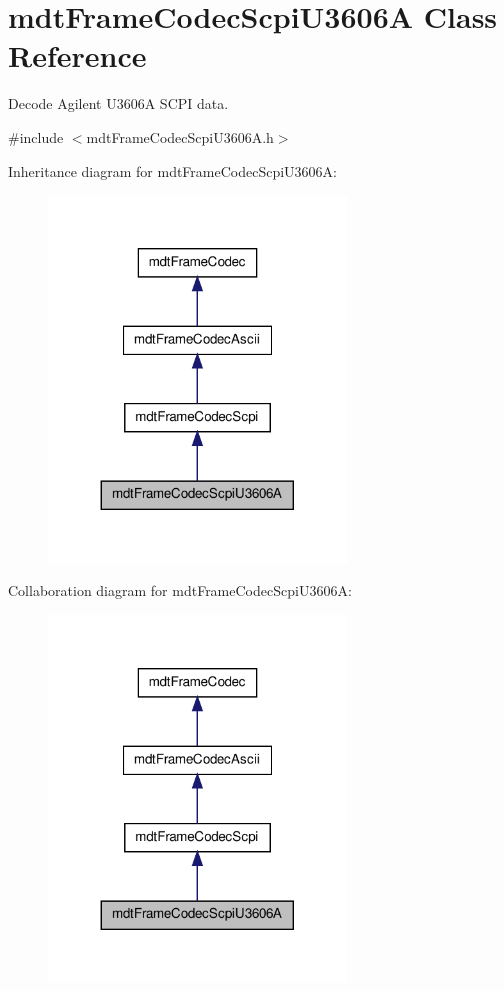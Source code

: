 \hypertarget{classmdt_frame_codec_scpi_u3606_a}{
\section{mdtFrameCodecScpiU3606A Class Reference}
\label{classmdt_frame_codec_scpi_u3606_a}
}


Decode Agilent U3606A SCPI data.  




{\ttfamily \#include $<$mdtFrameCodecScpiU3606A.h$>$}



Inheritance diagram for mdtFrameCodecScpiU3606A:\nopagebreak
\begin{figure}[H]
\begin{center}
\leavevmode
\includegraphics[width=224pt]{classmdt_frame_codec_scpi_u3606_a__inherit__graph}
\end{center}
\end{figure}


Collaboration diagram for mdtFrameCodecScpiU3606A:\nopagebreak
\begin{figure}[H]
\begin{center}
\leavevmode
\includegraphics[width=224pt]{classmdt_frame_codec_scpi_u3606_a__coll__graph}
\end{center}
\end{figure}
